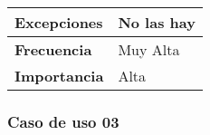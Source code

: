 \begin{longtable}{l|l}
\begin{minipage}{0.25\columnwidth}
\textbf{Excepciones} 
\end{minipage}
&
\begin{minipage}{0.65\columnwidth}
No las hay
\end{minipage}
\\ \hline

\begin{minipage}{0.25\columnwidth}
\textbf{Frecuencia} 
\end{minipage}
&
\begin{minipage}{0.65\columnwidth}
Muy Alta
\end{minipage}
\\ \hline

\begin{minipage}{0.25\columnwidth}
\textbf{Importancia} 
\end{minipage}
&
\begin{minipage}{0.65\columnwidth}
Alta
\end{minipage}
\\ \hline
\end{longtable}

\subsubsection{Caso de uso 03}

